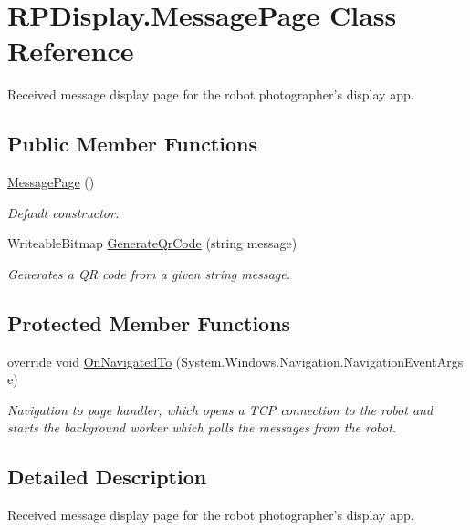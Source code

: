 \hypertarget{class_r_p_display_1_1_message_page}{\section{\-R\-P\-Display.\-Message\-Page \-Class \-Reference}
\label{class_r_p_display_1_1_message_page}
}


\-Received message display page for the robot photographer's display app.  


\subsection*{\-Public \-Member \-Functions}
\begin{DoxyCompactItemize}
\item 
\hyperlink{class_r_p_display_1_1_message_page_ab2514bc14135997bdb5ad82b96808b2e}{\-Message\-Page} ()
\begin{DoxyCompactList}\small\item\em \-Default constructor. \end{DoxyCompactList}\item 
\-Writeable\-Bitmap \hyperlink{class_r_p_display_1_1_message_page_ac682b4ffe16319decf7a77a154bd0913}{\-Generate\-Qr\-Code} (string message)
\begin{DoxyCompactList}\small\item\em \-Generates a \-Q\-R code from a given string message. \end{DoxyCompactList}\end{DoxyCompactItemize}
\subsection*{\-Protected \-Member \-Functions}
\begin{DoxyCompactItemize}
\item 
override void \hyperlink{class_r_p_display_1_1_message_page_aa945b7e6f95e38c847d305bbe0a73392}{\-On\-Navigated\-To} (\-System.\-Windows.\-Navigation.\-Navigation\-Event\-Args e)
\begin{DoxyCompactList}\small\item\em \-Navigation to page handler, which opens a \-T\-C\-P connection to the robot and starts the background worker which polls the messages from the robot. \end{DoxyCompactList}\end{DoxyCompactItemize}


\subsection{\-Detailed \-Description}
\-Received message display page for the robot photographer's display app. 



